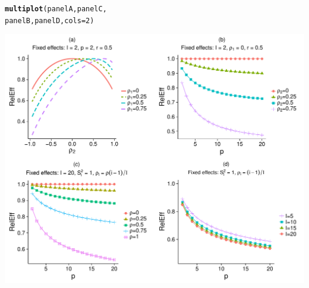 \documentclass{article}\usepackage[]{graphicx}\usepackage[]{color}
\makeatletter
\def\maxwidth{ %
  \ifdim\Gin@nat@width>\linewidth
    \linewidth
  \else
    \Gin@nat@width
  \fi
}
\newcommand{\hlnum}[1]{\textcolor[rgb]{0.686,0.059,0.569}{#1}}%
\newcommand{\hlstd}[1]{\textcolor[rgb]{0.345,0.345,0.345}{#1}}%
\newcommand{\hlkwc}[1]{\textcolor[rgb]{0.333,0.667,0.333}{#1}}%
\newcommand{\hlkwd}[1]{\textcolor[rgb]{0.737,0.353,0.396}{\textbf{#1}}}%
\newenvironment{kframe}{%
 \def\at@end@of@kframe{}%
 \ifinner\ifhmode%
  \def\at@end@of@kframe{\end{minipage}}%
  \begin{minipage}{\columnwidth}%
 \fi\fi%
 \def\FrameCommand##1{\hskip\@totalleftmargin \hskip-\fboxsep
 \colorbox{shadecolor}{##1}\hskip-\fboxsep
     \hskip-\linewidth \hskip-\@totalleftmargin \hskip\columnwidth}%
 \MakeFramed {\advance\hsize-\width
   \@totalleftmargin\z@ \linewidth\hsize
   \@setminipage}}%
 {\par\unskip\endMakeFramed%
 \at@end@of@kframe}
\newenvironment{knitrout}{}{} %
\makeatother
\begin{document}
\begin{knitrout}
\color{fgcolor}\begin{kframe}
\begin{alltt}
\hlkwd{multiplot}\hlstd{(panelA, panelC,}
          \hlstd{panelB, panelD,} \hlkwc{cols}\hlstd{=}\hlnum{2}\hlstd{)}
\end{alltt}


{\ttfamily\noindent\itshape\color{messagecolor}{\#\# Loading required package: grid}}\end{kframe}

{\centering \includegraphics[width=\maxwidth]{figures/Figure_1_panels_abcd-1} 

}



\end{knitrout}
\end{document}
